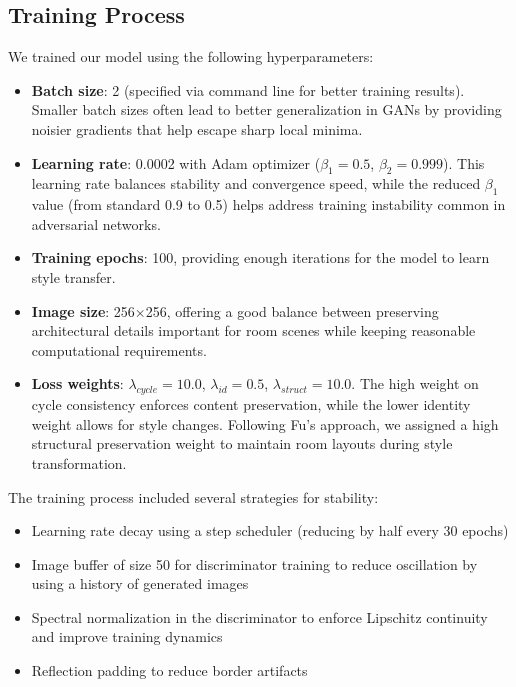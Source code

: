 \documentclass[twocolumn,superscriptaddress,aps]{revtex4-1}
\begin{document}
\subsection{Training Process}

We trained our model using the following hyperparameters:

\begin{itemize}
    \item \textbf{Batch size}: 2 (specified via command line for better training results). Smaller batch sizes often lead to better generalization in GANs by providing noisier gradients that help escape sharp local minima.
    
    \item \textbf{Learning rate}: 0.0002 with Adam optimizer ($\beta_1=0.5$, $\beta_2=0.999$). This learning rate balances stability and convergence speed, while the reduced $\beta_1$ value (from standard 0.9 to 0.5) helps address training instability common in adversarial networks.
    
    \item \textbf{Training epochs}: 100, providing enough iterations for the model to learn style transfer.
    
    \item \textbf{Image size}: 256×256, offering a good balance between preserving architectural details important for room scenes while keeping reasonable computational requirements.
    
    \item \textbf{Loss weights}: $\lambda_{cycle}=10.0$, $\lambda_{id}=0.5$, $\lambda_{struct}=10.0$. The high weight on cycle consistency enforces content preservation, while the lower identity weight allows for style changes. Following Fu's \cite{fu2022digital} approach, we assigned a high structural preservation weight to maintain room layouts during style transformation.
\end{itemize}

The training process included several strategies for stability:

\begin{itemize}
    \item Learning rate decay using a step scheduler (reducing by half every 30 epochs)
    \item Image buffer of size 50 for discriminator training to reduce oscillation by using a history of generated images
    \item Spectral normalization in the discriminator to enforce Lipschitz continuity and improve training dynamics
    \item Reflection padding to reduce border artifacts
\end{itemize}
\end{document}
